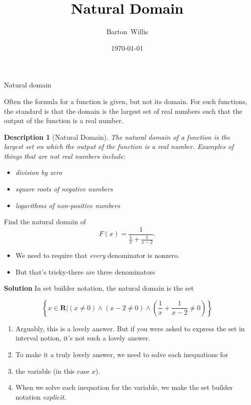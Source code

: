\documentclass[usenames,dvipsnames,fleqn,leqno,10pt, pdflatex]{beamer}
\author[bw]{}
\title[] %
{\textcolor{black}{\textbf{Natural Domain}} \\ 
\vspace{0.2in}
}
\date{\today}
\author[] %
{Barton~Willis}
\newcommand{\reals}{\mathbf{R}}
\newenvironment{PenList}{
  \begin{enumerate}[\textcolor{UNK-blue}{\PencilRightDown}]
    \addtolength{\itemsep}{-0.0\itemsep}}
  {\end{enumerate}}
\newtheorem{describ}{Description}
\begin{document}
\frame{\titlepage}

\begin{frame}{Natural domain}

Often the formula for a function is given, but not its domain. For
such functions, the standard is that the domain is the largest
set of real numbers such that the output of the function is a real number.

\begin{describ}[Natural Domain] The \emph{natural domain} of a function is the
        largest set on which the output of the function is a
        real number.  Examples of things that are \emph{not} real
        numbers include:
        \begin{itemize}
            \item division by zero
            \item square roots of negative numbers
            \item logarithms of non-positive numbers
        \end{itemize}
\end{describ}
    
\end{frame}
\begin{frame}

Find the natural domain of 
\begin{equation*}
    F(x) = \frac{1}{\frac{1}{x} + \frac{1}{x-2}}.
\end{equation*}

\begin{itemize}
    \item We need to require that \emph{every} denominator is nonzero.
    \item But that's tricky-there are three denominators
    
\end{itemize}

\textbf{Solution} In set builder notation, the natural domain is the set

\begin{equation*}
    \left\{ x \in \reals \bigg | \left(x \neq 0 \right)  
    \land \left(x-2 \neq 0 \right) \land  
    \left(\frac{1}{x} + \frac{1}{x-2} \neq 0 \right) \right\}
\end{equation*}

\begin{PenList}

    \item Arguably, this is a lovely answer. But if you were asked to express the
    set in interval notion, it's not such a lovely answer.

    \item To make it a truly lovely answer, we need to solve each inequations for 
    \item the variable (in this case  $x$).
    \item When we solve each inequation for the variable, we make the
    set builder notation \emph{explicit}.
    
\end{PenList}
\end{frame}
\end{document}
